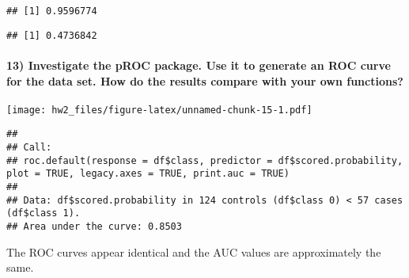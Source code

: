 \documentclass[]{article}
\newenvironment{Shaded}{\begin{snugshade}}{\end{snugshade}}
\newcommand{\KeywordTok}[1]{\textcolor[rgb]{0.13,0.29,0.53}{\textbf{#1}}}
\newcommand{\DataTypeTok}[1]{\textcolor[rgb]{0.13,0.29,0.53}{#1}}
\newcommand{\StringTok}[1]{\textcolor[rgb]{0.31,0.60,0.02}{#1}}
\newcommand{\OtherTok}[1]{\textcolor[rgb]{0.56,0.35,0.01}{#1}}
\newcommand{\OperatorTok}[1]{\textcolor[rgb]{0.81,0.36,0.00}{\textbf{#1}}}
\newcommand{\NormalTok}[1]{#1}
\let\oldparagraph\paragraph
\renewcommand{\paragraph}[1]{\oldparagraph{#1}\mbox{}}
\begin{document}
\begin{Shaded}
\end{Shaded}

\begin{verbatim}
## [1] 0.9596774
\end{verbatim}

\begin{Shaded}
\end{Shaded}

\begin{verbatim}
## [1] 0.4736842
\end{verbatim}

\paragraph{13) Investigate the pROC package. Use it to generate an ROC
curve for the data set. How do the results compare with your own
functions?}\label{investigate-the-proc-package.-use-it-to-generate-an-roc-curve-for-the-data-set.-how-do-the-results-compare-with-your-own-functions}

\begin{Shaded}
\end{Shaded}

\texttt{[image: hw2\_files/figure-latex/unnamed-chunk-15-1.pdf]}

\begin{verbatim}
## 
## Call:
## roc.default(response = df$class, predictor = df$scored.probability,     plot = TRUE, legacy.axes = TRUE, print.auc = TRUE)
## 
## Data: df$scored.probability in 124 controls (df$class 0) < 57 cases (df$class 1).
## Area under the curve: 0.8503
\end{verbatim}

The ROC curves appear identical and the AUC values are approximately the
same.
\end{document}
